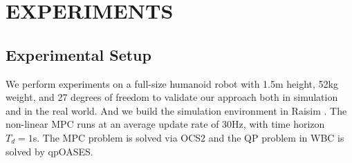\documentclass[a4paper, 10pt, conference]{ieeeconf}      %
\begin{document}

\section{EXPERIMENTS}

\subsection{Experimental Setup}

We perform experiments on a full-size humanoid robot with 1.5m height, 52kg weight, and 27 degrees of freedom to validate our approach both in simulation and in the real world. And we build the simulation environment in Raisim \cite{c26}. The non-linear MPC runs at an average update rate of 30Hz, with time horizon $T_d=1$s. The MPC problem is solved via OCS2 \cite{c28} and the QP problem in WBC \cite{c39} is solved by qpOASES.
\end{document}
